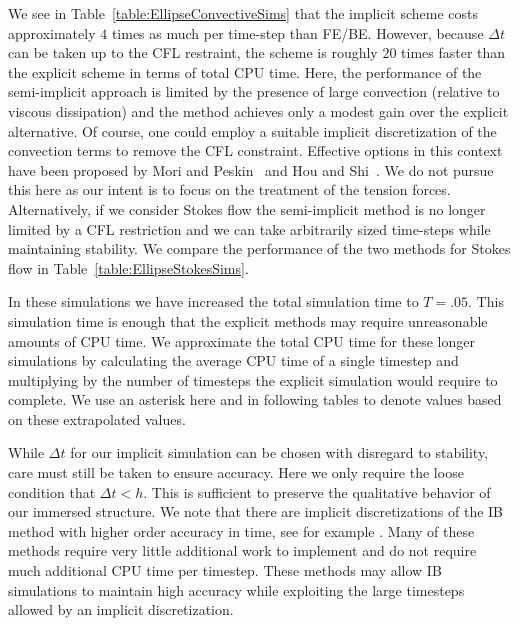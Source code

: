 \documentclass[preprint,12pt]{elsarticle}
\begin{document}
We see in Table~\ref{table:EllipseConvectiveSims}
that the implicit scheme costs approximately $4$ times as much per time-step than FE/BE. However, because $\Delta t$ can be taken up to the CFL restraint, the scheme is roughly $20$ times faster than the explicit scheme in terms of total CPU time. 
Here, the performance of the semi-implicit approach is limited by the presence of large convection (relative to  viscous dissipation) and the method achieves only a modest gain over the explicit alternative.  Of course, one could employ a suitable implicit discretization of the convection terms to remove the CFL constraint.  Effective options in this context have been proposed by
Mori and Peskin~\cite{MP2008} and Hou and Shi~\cite{HS2008b}. We do not pursue this 
here as our intent is to focus on the treatment of the tension forces. Alternatively, if we consider Stokes flow the semi-implicit method
is no longer limited by a CFL restriction and we can take arbitrarily sized time-steps  while maintaining stability.
We compare the performance of the two methods for Stokes flow in Table~\ref{table:EllipseStokesSims}. 

In these simulations we have increased the total simulation time to $T = .05$. This simulation time is enough that the explicit methods may require unreasonable amounts of CPU time. We approximate the total CPU time for these longer simulations by calculating the average CPU time of a single timestep and multiplying by the number of timesteps the explicit simulation would require to complete. We use an asterisk here and in following tables to denote values based on these extrapolated values.

While $\Delta t$ for our implicit simulation can be chosen with disregard to stability, care must still be taken to ensure accuracy. Here we only require the loose condition that $\Delta t < h$. This is sufficient to preserve the qualitative behavior of our immersed structure. We note that there are implicit discretizations of the IB method with higher order accuracy in time, see for example \cite{NFGK2007}. Many of these methods require very little additional work to implement and do not require much additional CPU time per timestep. These methods may allow IB simulations to maintain high accuracy while exploiting the large timesteps allowed by an implicit discretization.
\end{document}
